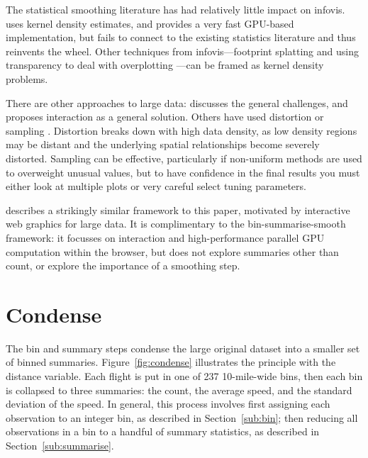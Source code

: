\documentclass[journal]{vgtc}                %
\begin{document}
The statistical smoothing literature has had relatively little impact on infovis. \citep{lampe:2011} uses kernel density estimates, and provides a very fast GPU-based implementation, but fails to connect to the existing statistics literature and thus reinvents the wheel. Other techniques from infovis---footprint splatting \citep{becker:1997,yang:2003} and using transparency to deal with overplotting \citep{johansson:2005,unwin:2006}---can be framed as kernel density problems.

There are other approaches to large data: \citep{heer:2012} discusses the general challenges, and proposes interaction as a general solution. Others have used distortion \citep{keim:2010} or sampling \citep{wegman:1995, bertini:2006a}. Distortion breaks down with high data density, as low density regions may be distant and the underlying spatial relationships become severely distorted. Sampling can be effective, particularly if non-uniform methods are used to overweight unusual values, but to have confidence in the final results you must either look at multiple plots or very careful select tuning parameters.

\citep{liu:2013} describes a strikingly similar framework to this paper, motivated by interactive web graphics for large data. It is complimentary to the bin-summarise-smooth framework: it focusses on interaction and high-performance parallel GPU computation within the browser, but does not explore summaries other than count, or explore the importance of a smoothing step. 

\section{Condense}
\label{sec:condense}

The bin and summary steps condense the large original dataset into a smaller set of binned summaries. Figure~\ref{fig:condense} illustrates the principle with the distance variable. Each flight is put in one of 237 10-mile-wide bins, then each bin is collapsed to three summaries: the count, the average speed, and the standard deviation of the speed. In general, this process involves first assigning each observation to an integer bin, as described in Section~\ref{sub:bin}; then reducing all observations in a bin to a handful of summary statistics, as described in Section~\ref{sub:summarise}.
\end{document}
